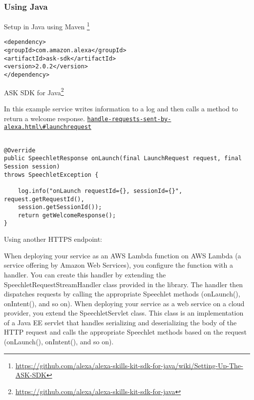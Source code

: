 \subsubsection*{Using Java}
Setup in Java using Maven \footnote{\url{https://github.com/alexa/alexa-skills-kit-sdk-for-java/wiki/Setting-Up-The-ASK-SDK}}

\begin{verbatim}
<dependency>
<groupId>com.amazon.alexa</groupId>
<artifactId>ask-sdk</artifactId>
<version>2.0.2</version>
</dependency>
\end{verbatim}

ASK SDK for Java\footnote{\url{https://github.com/alexa/alexa-skills-kit-sdk-for-java}}



In this example service writes information to a log and then calls a method to return a welcome response.
\href{https://developer.amazon.com/docs/custom-skills/handle-requests-sent-by-alexa.html\#launchrequest}{\lstinline|handle-requests-sent-by-alexa.html\#launchrequest|}
\begin{verbatim}

@Override
public SpeechletResponse onLaunch(final LaunchRequest request, final Session session)
throws SpeechletException {
	
	log.info("onLaunch requestId={}, sessionId={}", request.getRequestId(),
	session.getSessionId());
	return getWelcomeResponse();
}
\end{verbatim}



Using another HTTPS endpoint:

When deploying your service as an AWS Lambda function on AWS Lambda (a service offering by Amazon Web Services), you configure the function with a handler. You can create this handler by extending the SpeechletRequestStreamHandler class provided in the library. The handler then dispatches requests by calling the appropriate Speechlet methods (onLaunch(), onIntent(), and so on).
When deploying your service as a web service on a cloud provider, you extend the SpeechletServlet class. This class is an implementation of a Java EE servlet that handles serializing and deserializing the body of the HTTP request and calls the appropriate Speechlet methods based on the request (onLaunch(), onIntent(), and so on).




